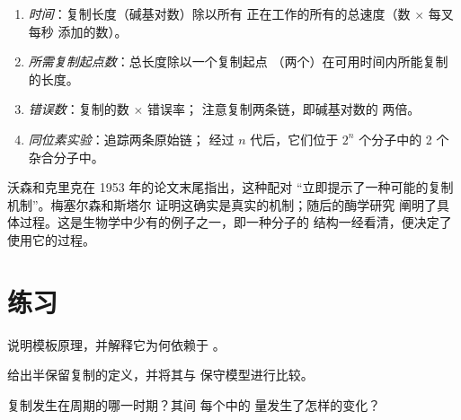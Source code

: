 \begin{method}[复制计算]\label{met:g11:dna-replication:calc}
\begin{enumerate}
  \item \emph{时间}：复制长度（碱基对数）除以所有
        正在工作的所有的总速度（数 $\times$ 每叉每秒
        添加的数）。
  \item \emph{所需复制起点数}：总长度除以一个复制起点
        （两个）在可用时间内所能复制的长度。
  \item \emph{错误数}：复制的数 $\times$ 错误率；
        注意复制两条链，即碱基对数的
        两倍。
  \item \emph{同位素实验}：追踪两条原始链；
        经过 $n$ 代后，它们位于 $2^n$ 个分子中的
        2 个杂合分子中。
\end{enumerate}
\end{method}

\begin{remark}[结构与机制为何吻合]\label{rem:g11:dna-replication:fit}
沃森和克里克在 1953 年的论文末尾指出，这种配对
“立即提示了一种可能的复制机制”。梅塞尔森和斯塔尔
证明这确实是真实的机制；随后的酶学研究
阐明了具体过程。这是生物学中少有的例子之一，即一种分子的
结构一经看清，便决定了使用它的过程。
\end{remark}

\section{练习}

\begin{exercise}[$\star$]\label{exo:g11:dna-replication:1}
说明模板原理，并解释它为何依赖于
。
\end{exercise}

\begin{exercise}[$\star$]\label{exo:g11:dna-replication:2}
给出半保留复制的定义，并将其与
保守模型进行比较。
\end{exercise}

\begin{exercise}[$\star$]\label{exo:g11:dna-replication:3}
复制发生在周期的哪一时期？其间
每个中的  量发生了怎样的变化？
\end{exercise}

